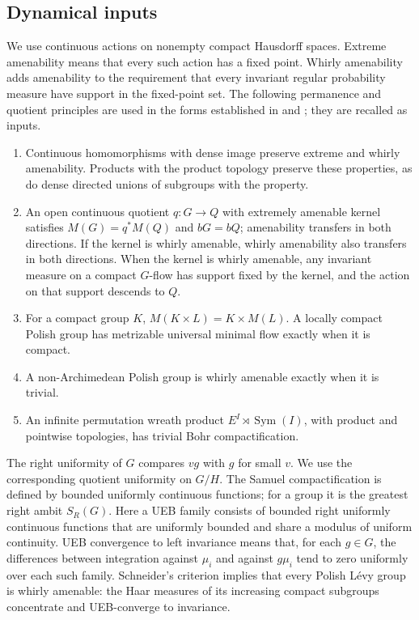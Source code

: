 \subsection{Dynamical inputs}\label{sec:un-prelim}

We use continuous actions on nonempty compact Hausdorff spaces. Extreme
amenability means that every such action has a fixed point. Whirly
amenability adds amenability to the requirement that every invariant
regular probability measure have support in the fixed-point set.
The following permanence and quotient principles are used in the forms established
in \cite[Section~2]{LupiniCuntz2026} and
\cite[Section~2]{LupiniStable2026}; they are recalled as inputs.

\begin{proposition}\label{prop:un-dynamical-inputs}
\begin{enumerate}
\item\label{item:un-dense-permanence} Continuous homomorphisms with dense image preserve extreme and
whirly amenability. Products with the product topology preserve these
properties, as do dense directed unions of subgroups with the property.
\item\label{item:un-kernel-principle} An open continuous quotient \(q:G\to Q\) with extremely amenable
kernel satisfies \(M(G)=q^*M(Q)\) and \(bG=bQ\); amenability transfers
in both directions. If the kernel is whirly amenable, whirly amenability
also transfers in both directions. When the kernel is whirly amenable,
any invariant measure on a compact \(G\)-flow has support fixed by the
kernel, and the action on that support descends to \(Q\).
\item\label{item:un-compact-principle} For a compact group \(K\),
\(M(K\times L)=K\times M(L)\). A locally compact Polish group has
metrizable universal minimal flow exactly when it is compact.
\item\label{item:un-nonarch-principle} A non-Archimedean Polish group is whirly amenable exactly when it
is trivial.
\item\label{item:un-wreath-principle} An infinite permutation wreath product
\(E^I\rtimes\operatorname{Sym}(I)\), with product and pointwise topologies, has
trivial Bohr compactification.
\end{enumerate}
\end{proposition}

The right uniformity of \(G\) compares \(vg\) with \(g\) for small
\(v\). We use the corresponding quotient uniformity on \(G/H\).
The Samuel compactification is defined by bounded uniformly continuous
functions; for a group it is the greatest right ambit \(S_R(G)\).
Here a UEB family consists of bounded right uniformly continuous
functions that are uniformly bounded and share a modulus of uniform
continuity. UEB convergence to left invariance means that, for each
\(g\in G\), the differences between integration against \(\mu_i\) and
against \(g\mu_i\) tend to zero uniformly over each such family.
Schneider's criterion \cite[Corollary~5.7]{Schneider2019} implies that every
Polish L\'evy group is whirly amenable: the Haar measures of its increasing
compact subgroups concentrate and UEB-converge to invariance.

